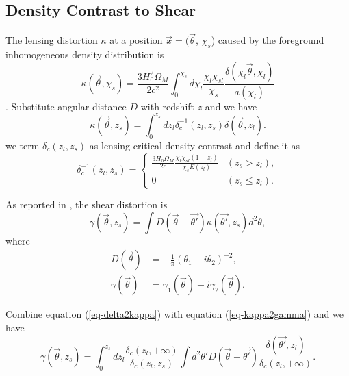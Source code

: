 \documentclass[twocolumn]{aastex62}
\newcommand{\vecb}[1]{{#1}}
\begin{document}
\subsection{Density Contrast to Shear}
The lensing distortion $\kappa$ at a position $\vec{x}=(\vec{\theta}$, $\chi_s$) caused by the foreground inhomogeneous density distribution is 
\begin{equation}
\kappa(\vec{\theta},\chi_s)=\frac{3H_0^2\Omega_M}{2 c^2} \int_0^{\chi_s} d\chi_l \frac{\chi_l \chi_{sl}}{\chi_s} \frac{\delta(\chi_l \vec{\theta},\chi_l)}{a(\chi_l)}
\end{equation}
\citep{massMap-Glimpse3D2014}.
Substitute angular distance $D$ with redshift $z$ and we have
\begin{equation}\label{eq-delta2kappa}
\kappa(\vec{\theta},z_s)=\int_0^{z_s} dz_l \delta_{c}^{-1}(z_l,z_s)\delta(\vec{\theta},z_l).
\end{equation}
we term $\delta_{c}(z_l,z_s)$ as lensing critical density contrast and define it as
\begin{equation}
\delta_{c}^{-1}(z_l,z_s) =
\begin{cases}
\frac{3H_0\Omega_M}{2 c} \frac{\chi_l \chi_{sl} (1+z_l)}{ \chi_s E(z_l)} & (z_s>z_l),\\
0&(z_s \leq z_l).
\end{cases}
\end{equation}

As reported in \citet{massMap-KS1993}, the shear distortion is
\begin{equation}\label{eq-kappa2gamma}
\vecb{\gamma}(\vec{\theta},z_s) = \int \vecb{D}(\vec{\theta}-\vec{\theta'}) \kappa(\vec{\theta'},z_s) d^2 \theta,
\end{equation}
where 
\begin{equation}
\begin{split}
\vecb{D}(\vec{\theta})&=-\frac{1}{\pi}(\theta_1-i\theta_2)^{-2},\\
\vecb{\gamma}(\vec{\theta})&=\gamma_1(\vec{\theta})+i\gamma_2(\vec{\theta}).
\end{split}
\end{equation}



Combine equation (\ref{eq-delta2kappa}) with equation (\ref{eq-kappa2gamma}) and we have
\begin{equation}\label{eq-delta2gamma-z}
\vecb{\gamma}(\vec{\theta},z_s) = \int_0^{z_s} dz_l \frac{\delta_c(z_l,+\infty)}{\delta_{c}(z_l,z_s)} \int d^2 \theta'  \vecb{D}(\vec{\theta}-\vec{\theta'}) \frac{\delta(\vec{\theta'},z_l)}{\delta_c(z_l,+\infty)}.
\end{equation}
\end{document}
